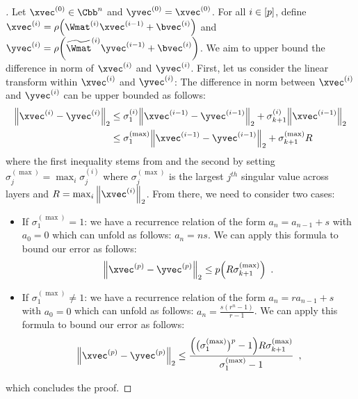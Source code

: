 \begin{proof}[]
  Let $\xvec^{(0)} \in \Cbb^n$ and $\yvec^{(0)} = \xvec^{(0)}$.
  For all $i \in [p]$, define $\xvec^{(i)} = \act \left(\Wmat^{(i)} \xvec^{(i-1)} + \bvec^{(i)} \right)$ and $\yvec^{(i)} = \act \left( \widetilde{\Wmat}^{(i)} \yvec^{(i-1)} + \bvec^{(i)} \right)$.
  We aim to upper bound the difference in norm of $\xvec^{(i)}$ and $\yvec^{(i)}$.
  First, let us consider the linear transform within $\xvec^{(i)}$ and $\yvec^{(i)}$:
  The difference in norm between $\xvec^{(i)}$ and $\yvec^{(i)}$ can be upper bounded as follows:
  \begin{align}
    \norm{ \xvec^{(i)} - \yvec^{(i)}}_2 &\le \sigma_{1}^{(i)} \norm{ \xvec^{(i-1)} - \yvec^{(i-1)}}_2 + \sigma_{k+1}^{(i)} \norm{ \xvec^{(i-1)}}_2 \\
    &\leq \sigma_1^{(\max)} \norm{ \xvec^{(i-1)} - \yvec^{(i-1)}}_2 + \sigma_{k+1}^{(\max)} R
  \end{align}
  where the first inequality stems from  and the second by setting $\sigma_j^{(\max)} = \max_i \sigma_j^{(i)}$ where $\sigma_j^{(\max)}$ is the largest $j^{th}$ singular value across layers and $R = \max_i \norm{\xvec^{(i)}}_2$.
  From there, we need to consider two cases:
  \begin{itemize}
    \item If $\sigma_1^{(\max)} = 1$: we have a recurrence relation of the form $a_n = a_{n-1} + s$ with $a_0 = 0$ which can unfold as follows: $a_n = ns$.
      We can apply this formula to bound our error as follows:
      \begin{equation}
	\norm{ \xvec^{(\depth)} - \yvec^{(\depth)}}_2 \le \depth \left(  R \sigma_{k+1}^{(\max)} \right) \enspace.
      \end{equation}
    \item If $\sigma_1^{(\max)} \neq 1$: we have a recurrence relation of the form $a_n = r a_{n-1} + s$ with $a_0= 0$ which can unfold as follows: $a_n = \frac{s \left(r^n - 1\right)}{r-1}$.
      We can apply this formula to bound our error as follows:
      \begin{equation}
	\norm{ \xvec^{(\depth)} - \yvec^{(\depth)} }_2 \le \frac{ \left( \big(\sigma_1^{(\max)}\big)^\depth - 1 \right) R \sigma_{k+1}^{(\max)}}{\sigma_1^{(\max)}-1} \enspace,
      \end{equation}
  \end{itemize}
  which concludes the proof.
\end{proof}

